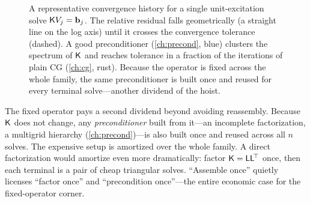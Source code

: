 \begin{figure}[t]
\centering
{}
\caption[CG convergence for one terminal solve]{A representative convergence
history for a single unit-excitation solve $\mathsf{K} V_j=\mathbf{b}_j$. The relative residual
falls geometrically (a straight line on the log axis) until it crosses the
convergence tolerance (dashed). A good preconditioner (\cref{ch:precond}, blue)
clusters the spectrum of $\mathsf{K}$ and reaches tolerance in a fraction of the
iterations of plain CG (\cref{ch:cg}, rust). Because the operator is fixed across
the whole family, the same preconditioner is built once and reused for every
terminal solve---another dividend of the hoist.}
\label{fig:es-cg}
\end{figure}

\begin{notationbox}
The fixed operator pays a second dividend beyond avoiding reassembly. Because
$\mathsf{K}$ does not change, any \emph{preconditioner} built from it---an incomplete
factorization, a multigrid hierarchy (\cref{ch:precond})---is also built once and
reused across all $n$ solves. The expensive setup is amortized over the whole
family. A direct factorization would amortize even more dramatically: factor
$\mathsf{K}=\mathsf{L}\mathsf{L}^{\!\top}$ once, then each terminal is a pair of cheap
triangular solves. ``Assemble once'' quietly licenses ``factor once'' and
``precondition once''---the entire economic case for the fixed-operator corner.
\end{notationbox}

